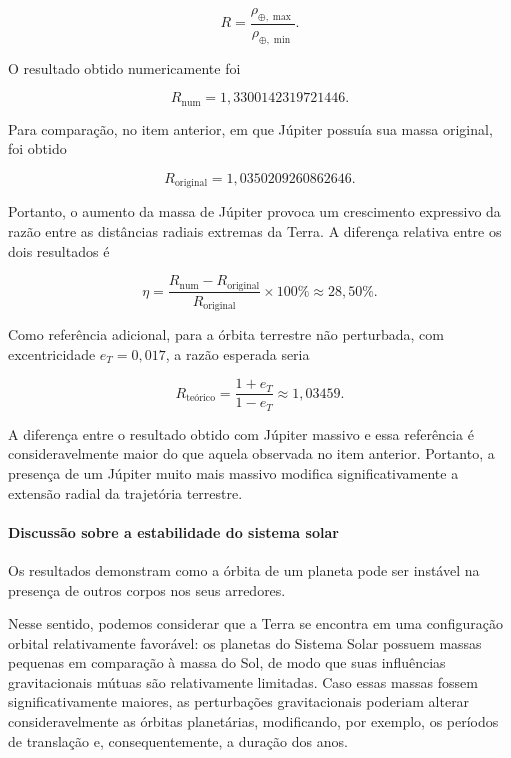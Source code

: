 \documentclass[12pt,a4paper]{article}
\begin{document}
\begin{equation}
    R=
    \frac{\rho_{\oplus,\max}}
    {\rho_{\oplus,\min}}.
\end{equation}

O resultado obtido numericamente foi

\begin{equation}
    \boxed{
    R_{\mathrm{num}}=1,3300142319721446
    }.
\end{equation}

Para comparação, no item anterior, em que Júpiter possuía sua massa original, foi obtido

\begin{equation}
    R_{\mathrm{original}}=1,0350209260862646.
\end{equation}

Portanto, o aumento da massa de Júpiter provoca um crescimento expressivo da razão entre as distâncias radiais extremas da Terra. A diferença relativa entre os dois resultados é

\begin{equation}
    \eta=
    \frac{R_{\mathrm{num}}-R_{\mathrm{original}}}
    {R_{\mathrm{original}}}\times100\%
    \approx28,50\%.
\end{equation}

Como referência adicional, para a órbita terrestre não perturbada, com excentricidade $e_T=0,017$, a razão esperada seria

\begin{equation}
    R_{\mathrm{teórico}}
    =
    \frac{1+e_T}{1-e_T}
    \approx1,03459.
\end{equation}

A diferença entre o resultado obtido com Júpiter massivo e essa referência é consideravelmente maior do que aquela observada no item anterior. Portanto, a presença de um Júpiter muito mais massivo modifica significativamente a extensão radial da trajetória terrestre.

\paragraph{Discussão sobre a estabilidade do sistema solar}

Os resultados demonstram como a órbita de um planeta pode ser instável na presença de outros corpos nos seus arredores. 

Nesse sentido, podemos considerar que a Terra se encontra em uma configuração orbital relativamente favorável: os planetas do Sistema Solar possuem massas pequenas em comparação à massa do Sol, de modo que suas influências gravitacionais mútuas são relativamente limitadas. Caso essas massas fossem significativamente maiores, as perturbações gravitacionais poderiam alterar consideravelmente as órbitas planetárias, modificando, por exemplo, os períodos de translação e, consequentemente, a duração dos anos.
\end{document}
